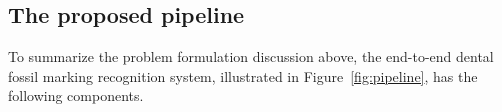 \documentclass[english,twoside,openright]{UH_DS_MSc}
\begin{document}
\subsection{The proposed pipeline}


To summarize the problem formulation discussion above, the end-to-end dental fossil marking recognition system,
illustrated in Figure~\ref{fig:pipeline}, has 
the following components. 
\end{document}
